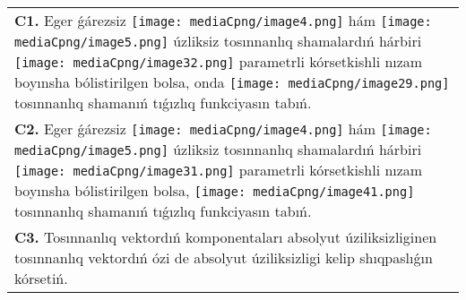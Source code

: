 \documentclass{article}
\begin{document}
\begin{tabular}{m{17cm}}
\textbf{C1.} Eger ǵárezsiz \texttt{[image: mediaCpng/image4.png]} hám \texttt{[image: mediaCpng/image5.png]} úzliksiz tosınnanlıq shamalardıń hárbiri \texttt{[image: mediaCpng/image32.png]} parametrli kórsetkishli nızam boyınsha bólistirilgen bolsa, onda \texttt{[image: mediaCpng/image29.png]} tosınnanlıq shamanıń tıǵızlıq funkciyasın tabıń.
 \\
\textbf{C2.} Eger ǵárezsiz \texttt{[image: mediaCpng/image4.png]} hám \texttt{[image: mediaCpng/image5.png]} úzliksiz tosınnanlıq shamalardıń hárbiri \texttt{[image: mediaCpng/image31.png]} parametrli kórsetkishli nızam boyınsha bólistirilgen bolsa, \texttt{[image: mediaCpng/image41.png]} tosınnanlıq shamanıń tıǵızlıq funkciyasın tabıń.
 \\
\textbf{C3.} Tosınnanlıq vektordıń komponentaları absolyut úziliksizliginen tosınnanlıq vektordıń ózi de absolyut úziliksizligi kelip shıqpaslıǵın kórsetiń.
 \\

\end{tabular}
\vspace{1cm}
\end{document}
